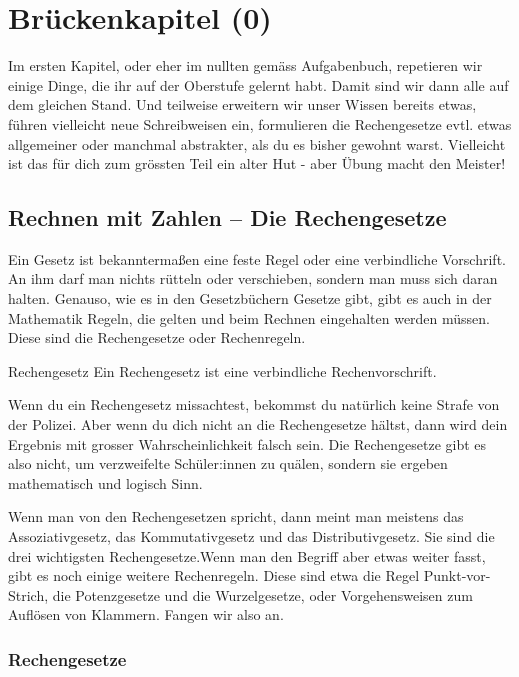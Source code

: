 \chapter{Brückenkapitel (0)}
Im ersten Kapitel, oder eher im nullten gemäss Aufgabenbuch, repetieren wir einige Dinge, die ihr auf der Oberstufe gelernt habt.
Damit sind wir dann alle auf dem gleichen Stand.
Und teilweise erweitern wir unser Wissen bereits etwas, führen vielleicht neue Schreibweisen ein, formulieren die Rechengesetze evtl. etwas allgemeiner oder manchmal abstrakter, als du es bisher gewohnt warst. Vielleicht ist das für dich zum grössten Teil ein alter Hut - aber Übung macht den Meister!

\section{Rechnen mit Zahlen -- Die Rechengesetze}
Ein Gesetz ist bekanntermaßen eine feste Regel oder eine verbindliche Vorschrift.
An ihm darf man nichts rütteln oder verschieben, sondern man muss sich daran halten.
Genauso, wie es in den Gesetzbüchern Gesetze gibt, gibt es auch in der Mathematik Regeln, die gelten und beim Rechnen eingehalten werden müssen.
Diese sind die Rechengesetze oder Rechenregeln.
\begin{defn}{Rechengesetz}
		Ein Rechengesetz ist eine verbindliche Rechenvorschrift.
\end{defn}
Wenn du ein Rechengesetz missachtest, bekommst du natürlich keine Strafe von der Polizei.
Aber wenn du dich nicht an die Rechengesetze hältst, dann wird dein Ergebnis mit grosser Wahrscheinlichkeit falsch sein.
Die Rechengesetze gibt es also nicht, um verzweifelte Schüler:innen zu quälen, sondern sie ergeben mathematisch und logisch Sinn.

Wenn man von den Rechengesetzen spricht, dann meint man meistens das Assoziativgesetz, das Kommutativgesetz und das Distributivgesetz.
Sie sind die drei wichtigsten Rechengesetze.Wenn man den Begriff aber etwas weiter fasst, gibt es noch einige weitere Rechenregeln.
Diese sind etwa die Regel Punkt-vor-Strich, die Potenzgesetze und die Wurzelgesetze, oder Vorgehensweisen zum Auflösen von Klammern.
Fangen wir also an.

\subsection{Rechengesetze}


